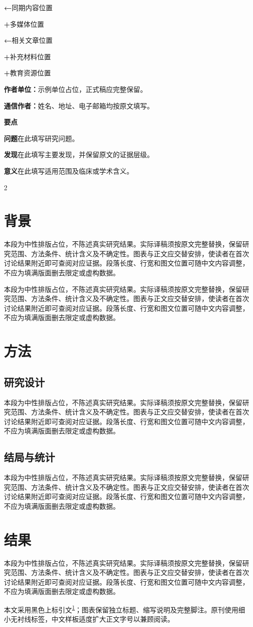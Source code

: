\documentclass[UTF8,fontset=none]{ctexart}
\newcommand{\neutralpara}{本段为中性排版占位，不陈述真实研究结果。实际译稿须按原文完整替换，保留研究范围、方法条件、统计含义及不确定性。图表与正文应交替安排，使读者在首次讨论结果附近即可查阅对应证据。段落长度、行宽和图文位置可随中文内容调整，不应为填满版面删去限定或虚构数据。}
\begin{document}
\begin{minipage}[t]{108bp}
\textcolor{JAMARed}{\textbf{←}}\enspace 同期内容位置\par\medskip
\textcolor{JAMARed}{\textbf{+}}\enspace 多媒体位置\par\medskip
\textcolor{JAMARed}{\textbf{←}}\enspace 相关文章位置\par\medskip
\textcolor{JAMARed}{\textbf{+}}\enspace 补充材料位置\par\medskip
\textcolor{JAMARed}{\textbf{+}}\enspace 教育资源位置\par
\vspace{374bp}\textbf{作者单位：}示例单位占位，正式稿应完整保留。\par\medskip
\textbf{通信作者：}姓名、地址、电子邮箱均按原文填写。\par\medskip
\end{minipage}
\clearpage
\noindent\colorbox{JAMABeige}{\begin{minipage}{\dimexpr\linewidth-2\fboxsep}\sffamily\fontsize{8.5bp}{11.1bp}\selectfont\textbf{要点}\par\smallskip\textbf{问题}\quad 在此填写研究问题。\par\smallskip\textbf{发现}\quad 在此填写主要发现，并保留原文的证据层级。\par\smallskip\textbf{意义}\quad 在此填写适用范围及临床或学术含义。\end{minipage}}\par
\begin{multicols}{2}\fontsize{8.8bp}{11.6bp}\selectfont
\section*{背景}\neutralpara\par\neutralpara
\section*{方法}\subsection*{研究设计}\neutralpara\par\subsection*{结局与统计}\neutralpara
\section*{结果}\neutralpara\par 本文采用黑色上标引文\textsuperscript{\hyperlink{ref:1}{1}}；图表保留独立标题、缩写说明及完整脚注。原刊使用细小无衬线标签，中文样板适度扩大正文字号以兼顾阅读。
\end{multicols}
\end{document}
